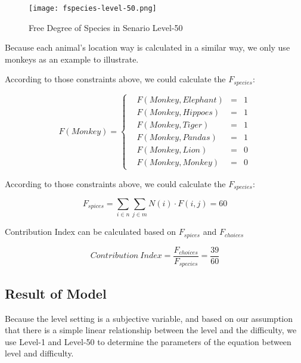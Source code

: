 \documentclass{mcmthesis}
\begin{document}
				\begin{figure}[h]
					\small
					\centering
					\texttt{[image: fspecies-level-50.png]}
					\caption{Free Degree of Species in Senario Level-50} \label{fig:fspecies-level-50}
				\end{figure}
			
				Because each animal's location way is calculated in a similar way, we only use monkeys as an example to illustrate. 
				
				According to those constraints above, we could calculate the $F_{species}$:
				
				
				\begin{equation}
				F(Monkey)=\left\{
				\begin{aligned}
				& F (Monkey, Elephant) & = & 1 \\
				& F (Monkey, Hippoes) & = & 1 \\
				& F (Monkey, Tiger) & = & 1 \\
				& F (Monkey, Pandas) & = & 1 \\
				& F (Monkey, Lion) & = & 0 \\
				& F (Monkey, Monkey) & = & 0
				\end{aligned}
				\right.
				\end{equation}
				
				
				According to those constraints above, we could calculate the $F_{species}$:
				
				\begin{equation}
				F_{spices} = \sum _ { i \in n } \sum _ { j \in m } N (i) \cdot F ( i , j ) = 60
				\end{equation}
				
				Contribution Index can be calculated based on $F_{spices}$ and $F_{choices}$
				
				\begin{equation}
				Contribution\ Index = \frac{F_{choices}}{F_{species}} = \frac{39}{60}
				\end{equation}
				
				
		\subsection{Result of Model}
		
			Because the level setting is a subjective variable, and based on our assumption that there is a simple linear relationship between the level and the difficulty, we use Level-1 and Level-50 to determine the parameters of the equation between level and difficulty.
			
\end{document}
